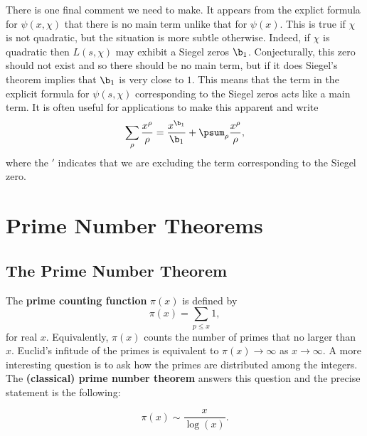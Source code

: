       There is one final comment we need to make. It appears from the explict formula for $\psi(x,\chi)$ that there is no main term unlike that for $\psi(x)$. This is true if $\chi$ is not quadratic, but the situation is more subtle otherwise. Indeed, if $\chi$ is quadratic then $L(s,\chi)$ may exhibit a Siegel zeros $\b_{1}$. Conjecturally, this zero should not exist and so there should be no main term, but if it does Siegel's theorem implies that $\b_{1}$ is very close to $1$. This means that the term in the explicit formula for $\psi(s,\chi)$ corresponding to the Siegel zeros acts like a main term. It is often useful for applications to make this apparent and write
      \[
        \sum_{\rho}\frac{x^{\rho}}{\rho} = \frac{x^{\b_{1}}}{\b_{1}}+\psum_{\rho}\frac{x^{\rho}}{\rho},
      \]
      where the $'$ indicates that we are excluding the term corresponding to the Siegel zero.
  \section{Prime Number Theorems}
    \subsection*{The Prime Number Theorem}
      The \textbf{prime counting function} $\pi(x)$ is defined by
      \[
        \pi(x) = \sum_{p \le x}1,
      \]
      for real $x$. Equivalently, $\pi(x)$ counts the number of primes that no larger than $x$. Euclid's infitude of the primes is equivalent to $\pi(x) \to \infty$ as $x \to \infty$. A more interesting question is to ask how the primes are distributed among the integers. The \textbf{(classical) prime number theorem} answers this question and the precise statement is the following:

      \begin{theorem}
        \phantom{ }
        \[
          \pi(x) \sim \frac{x}{\log(x)}.
        \]
      \end{theorem}

